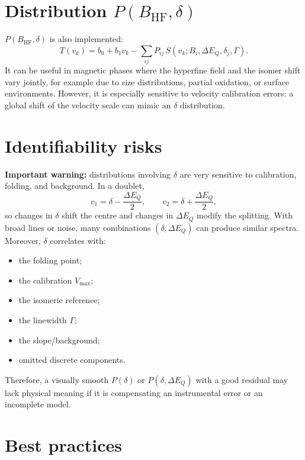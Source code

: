 \documentclass[11pt,a4paper]{article}
\newcommand{\IS}{\delta}
\newcommand{\QS}{\Delta E_Q}
\newcommand{\BHF}{B_{\mathrm{HF}}}
\begin{document}
\section{Distribution $P(\BHF,\IS)$}

$P(\BHF,\IS)$ is also implemented:
\begin{equation}
  T(v_k)=b_0+b_1v_k-\sum_{ij}P_{ij}\,
  S(v_k;B_i,\QS,\IS_j,\Gamma).
\end{equation}
It can be useful in magnetic phases where the hyperfine field and the isomer
shift vary jointly, for example due to size distributions, partial oxidation,
or surface environments. However, it is especially sensitive to velocity
calibration errors: a global shift of the velocity scale can mimic an $\IS$
distribution.

\section{Identifiability risks}

\textbf{Important warning:} distributions involving $\IS$ are very sensitive to
calibration, folding, and background. In a doublet,
\begin{equation}
  v_1=\IS-\frac{\QS}{2},\qquad v_2=\IS+\frac{\QS}{2},
\end{equation}
so changes in $\IS$ shift the centre and changes in $\QS$ modify the splitting.
With broad lines or noise, many combinations $(\IS,\QS)$ can produce similar
spectra. Moreover, $\IS$ correlates with:
\begin{itemize}
  \item the folding point;
  \item the calibration $V_{\max}$;
  \item the isomeric reference;
  \item the linewidth $\Gamma$;
  \item the slope/background;
  \item omitted discrete components.
\end{itemize}
Therefore, a visually smooth $P(\IS)$ or $P(\IS,\QS)$ with a good residual may
lack physical meaning if it is compensating an instrumental error or an
incomplete model.

\section{Best practices}
\end{document}
